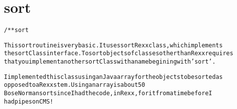 \section{sort}
\begin{shaded}
\begin{alltt}
/** sort

This sort routine is very basic.  It uses sortRexx class, which implements
the sortClass interface.  To sort objects of classes other than Rexx requires
that you implement another sortClass with a name begining with 'sort'.

I implemented this class using an Java array for the objects to be sorted as
opposed to a Rexx stem.  Using an array is about 50% faster.  I choose a quick/
Bose Norman sort since I had the code, in Rexx, for it from a time before I
had pipes on CMS!

\end{alltt}
\end{shaded}

